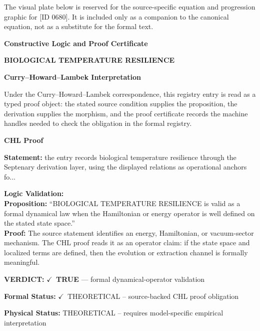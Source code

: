 \begingroup\footnotesize\sloppy
The visual plate below is reserved for the source-specific equation and progression graphic for [ID 0680]. It is included only as a companion to the canonical equation, not as a substitute for the formal text.
\par\endgroup
\ifTZPDarkEdition
{}
\fi

\clearpage
\begingroup\tzpsupportsetup
\noindent\textbf{\fontsize{10.8pt}{12.8pt}\selectfont [ID 0680] Constructive Logic and Proof Certificate}\par
\noindent\textbf{\fontsize{10pt}{12pt}\selectfont BIOLOGICAL TEMPERATURE RESILIENCE}\par
\vspace{0.45em}
\begingroup
\footnotesize
\setlength{\parskip}{0.22em}
\setlength{\parindent}{0pt}
\noindent\textbf{Curry--Howard--Lambek Interpretation}\par
Under the Curry--Howard--Lambek correspondence, this registry entry is read as a typed proof
object: the stated source condition supplies the proposition, the derivation supplies the
morphism, and the proof certificate records the machine handles needed to check the obligation
in the formal registry.

\vspace{0.45em}
\noindent\textbf{CHL Proof}\par
\textbf{Statement:} the entry records biological temperature resilience through the Septenary derivation
layer, using the displayed relations as operational anchors fo...

\textbf{Logic Validation:}\\
\textbf{Proposition:} ``BIOLOGICAL TEMPERATURE RESILIENCE is valid as a formal dynamical law when the
Hamiltonian or energy operator is well defined on the stated state space.''\\
\textbf{Proof:} The source statement identifies an energy, Hamiltonian, or vacuum-sector mechanism. The
CHL proof reads it as an operator claim: if the state space and localized terms are
defined, then the evolution or extraction channel is formally meaningful.

\textbf{VERDICT:} \ensuremath{\checkmark}\ \textbf{TRUE} --- formal dynamical-operator validation

\textbf{Formal Status:} \ensuremath{\checkmark}\ THEORETICAL -- source-backed CHL proof obligation

\textbf{Physical Status:} THEORETICAL -- requires model-specific empirical interpretation
\par\vspace{0.45em}
\par
\ifTZPDarkEdition
{}
\fi
\endgroup
\endgroup
